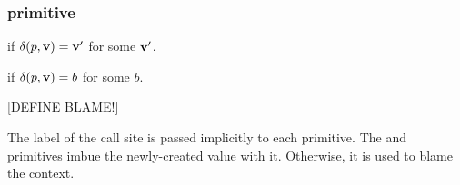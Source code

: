 \subsubsection{primitive}
if $\delta(p,\mathbf{v})=\mathbf{v'}$ for some $\mathbf{v'}$.

if $\delta(p,\mathbf{v})=b$ for some $b$.

[DEFINE BLAME!]

The label of the call site is passed implicitly to each primitive.
The  and  primitives imbue the newly-created value with it.
Otherwise, it is used to blame the context.

\newcommand{\primone}[4]{$\delta$(#1,$\langle #2 \rangle$) &= $\langle #3 \rangle$ & #4}
\newcommand{\primtwo}[5]{$\delta$(#1,$\langle #2, #3 \rangle$) &= $\langle #4 \rangle$ & #5}
\newcommand{\primtwe}[4]{$\delta$(#1,$\langle #2, #3 \rangle$) &= $\ell$ & #4}
\newcommand{\primfou}[7]{$\delta$(#1,$\langle #2, #3, #4, #5\rangle$) &= $\langle #6 \rangle$ & #7}
\newcommand{\primfoe}[6]{$\delta$(#1,$\langle #2, #3, #4, #5\rangle$) &= $\ell$ & #6}
